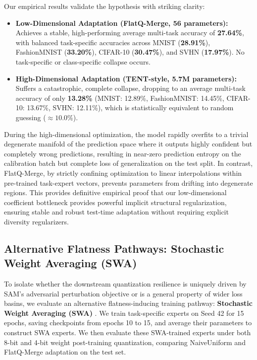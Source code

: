 Our empirical results validate the hypothesis with striking clarity:
\begin{itemize}
    \item \textbf{Low-Dimensional Adaptation (FlatQ-Merge, 56 parameters):} Achieves a stable, high-performing average multi-task accuracy of \textbf{27.64\%}, with balanced task-specific accuracies across MNIST (\textbf{28.91\%}), FashionMNIST (\textbf{33.20\%}), CIFAR-10 (\textbf{30.47\%}), and SVHN (\textbf{17.97\%}). No task-specific or class-specific collapse occurs.
    \item \textbf{High-Dimensional Adaptation (TENT-style, 5.7M parameters):} Suffers a catastrophic, complete collapse, dropping to an average multi-task accuracy of only \textbf{13.28\%} (MNIST: 12.89\%, FashionMNIST: 14.45\%, CIFAR-10: 13.67\%, SVHN: 12.11\%), which is statistically equivalent to random guessing ($\approx 10.0\%$).
\end{itemize}
During the high-dimensional optimization, the model rapidly overfits to a trivial degenerate manifold of the prediction space where it outputs highly confident but completely wrong predictions, resulting in near-zero prediction entropy on the calibration batch but complete loss of generalization on the test split. In contrast, FlatQ-Merge, by strictly confining optimization to linear interpolations within pre-trained task-expert vectors, prevents parameters from drifting into degenerate regions. This provides definitive empirical proof that our low-dimensional coefficient bottleneck provides powerful implicit structural regularization, ensuring stable and robust test-time adaptation without requiring explicit diversity regularizers.

\subsection{Alternative Flatness Pathways: Stochastic Weight Averaging (SWA)}
\label{sec:exp_swa}
To isolate whether the downstream quantization resilience is uniquely driven by SAM's adversarial perturbation objective or is a general property of wider loss basins, we evaluate an alternative flatness-inducing training pathway: \textbf{Stochastic Weight Averaging (SWA)} \cite{Izmailov2018SWA}. We train task-specific experts on Seed 42 for 15 epochs, saving checkpoints from epochs 10 to 15, and average their parameters to construct SWA experts. We then evaluate these SWA-trained experts under both 8-bit and 4-bit weight post-training quantization, comparing NaiveUniform and FlatQ-Merge adaptation on the test set.

